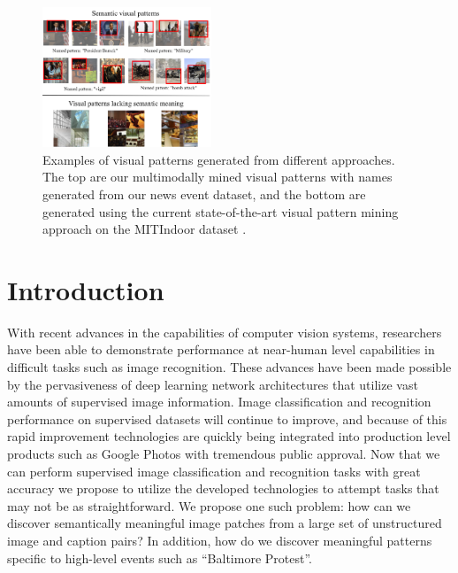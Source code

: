 \documentclass[10pt,twocolumn,letterpaper]{article}
\begin{document}
\begin{figure}
  \centering
  \includegraphics[width=0.45\textwidth]{imgs/patterns3.png}
  \caption{Examples of visual patterns generated from different approaches. The top are our multimodally mined visual patterns with names generated from our news event dataset, and the bottom are generated using the current state-of-the-art visual pattern mining approach on the MITIndoor dataset \cite{LiLSH15CVPR}.}
  \label{fig:patterns}
\end{figure}

\section{Introduction}
With recent advances in the capabilities of computer vision systems, researchers have been able to demonstrate performance at near-human level capabilities in difficult tasks such as image recognition.
These advances have been made possible by the pervasiveness of deep learning network architectures that utilize vast amounts of supervised image information.
Image classification and recognition performance on supervised datasets will continue to improve, and because of this rapid improvement technologies are quickly being integrated into production level products such as Google Photos with tremendous public approval.
Now that we can perform supervised image classification and recognition tasks with great accuracy we propose to utilize the developed technologies to attempt tasks that may not be as straightforward.
We propose one such problem: how can we discover semantically meaningful image patches from a large set of unstructured image and caption pairs? In addition, how do we discover meaningful patterns specific to high-level events such as ``Baltimore Protest''.
\end{document}
